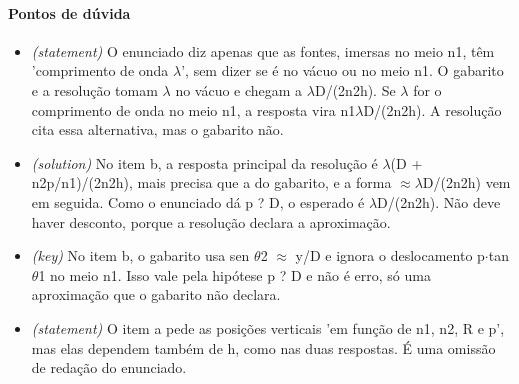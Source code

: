 \documentclass{article}%
\begin{document}
\paragraph{Pontos de dúvida}%
\begin{itemize}%
\item%
\textit{(statement)} O enunciado diz apenas que as fontes, imersas no meio n1, têm 'comprimento de onda $\lambda$', sem dizer se é no vácuo ou no meio n1. O gabarito e a resolução tomam $\lambda$ no vácuo e chegam a $\lambda$D/(2n2h). Se $\lambda$ for o comprimento de onda no meio n1, a resposta vira n1$\lambda$D/(2n2h). A resolução cita essa alternativa, mas o gabarito não.%
\item%
\textit{(solution)} No item b, a resposta principal da resolução é $\lambda$(D + n2p/n1)/(2n2h), mais precisa que a do gabarito, e a forma $\approx$$\lambda$D/(2n2h) vem em seguida. Como o enunciado dá p ? D, o esperado é $\lambda$D/(2n2h). Não deve haver desconto, porque a resolução declara a aproximação.%
\item%
\textit{(key)} No item b, o gabarito usa sen $\theta$2 $\approx$ y/D e ignora o deslocamento p$\cdot$tan $\theta$1 no meio n1. Isso vale pela hipótese p ? D e não é erro, só uma aproximação que o gabarito não declara.%
\item%
\textit{(statement)} O item a pede as posições verticais 'em função de n1, n2, R e p', mas elas dependem também de h, como nas duas respostas. É uma omissão de redação do enunciado.%
\end{itemize}%
\end{document}
